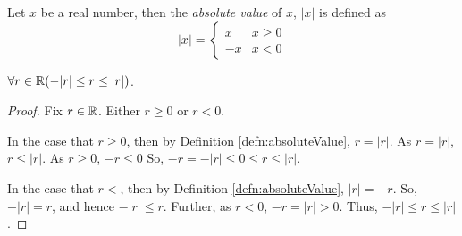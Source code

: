 







\begin{defn}
\label{defn:absoluteValue}
  Let $x$ be a real number, then the \emph{absolute value} of $x$, $\vert x\vert$ is defined as
  \[ \vert x\vert = \begin{cases}
      x & x\geq 0 \\
      -x& x < 0
   \end{cases} \]
\end{defn}

\begin{lem}
\label{lem:realIsBoundedAboveAndBelowItsAbsoluteValue}
  $\forall r\in\mathbb{R}(-\vert r\vert\leq r \leq\vert r\vert)$.
\end{lem}
\begin{proof}
  Fix $r\in\mathbb{R}$.
  Either $r\geq 0$ or $r<0$.

  In the case that $r\geq0$, then by Definition \ref{defn:absoluteValue}, $r=\vert r\vert$.
  As $r=\vert r\vert$, $r\leq\vert r\vert$.
  As $r\geq 0$, $-r\leq0$
  So, $-r=-\vert r\vert \leq 0\leq r\leq\vert r\vert$.

  In the case that $r<$, then by Definition \ref{defn:absoluteValue}, $\vert r\vert=-r$.
  So, $-\vert r\vert=r$, and hence $-\vert r \vert\leq r$.
  Further, as $r<0$, $-r=\vert r\vert>0$.
  Thus, $-\vert r\vert \leq r\leq\vert r\vert$.
\end{proof}

